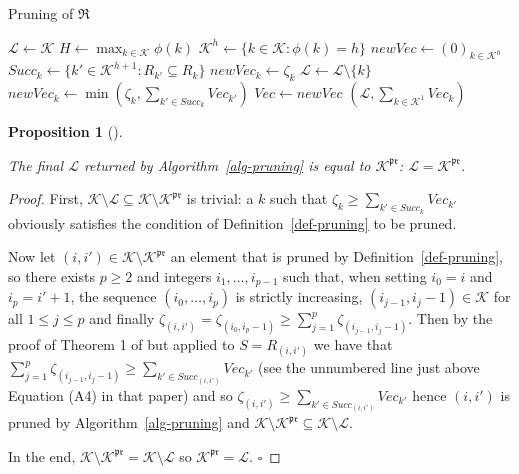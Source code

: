 \documentclass[
  11pt,
  a4paper,
]{article}
\theoremstyle{plain}
\newtheorem{proposition}{Proposition}[section]
\theoremstyle{plain}
\theoremstyle{plain}
\theoremstyle{definition}
\theoremstyle{definition}
\theoremstyle{remark}
\begin{document}
\begin{algorithm}[htb!]
\caption{Pruning of $\mathfrak{R}$}
\label{alg-pruning}
\begin{algorithmic}[1]
  \State $\mathcal{L}\gets\mathcal{K}$
  \State $ H \gets \max_{k\in\mathcal{K}} \phi(k)  $ 
    \State $\mathcal{K}^h\gets \{ k\in\mathcal{K} : \phi(k) =h  \}$
    \State $newVec\gets (0)_{k \in  \mathcal{K}^h}$
      \State $Succ_k \gets \{ k' \in  \mathcal{K}^{h+1} : R_{k'}\subseteq R_k\}$
        \State $newVec_k \gets \zeta_k$
      \Else
          \State $\mathcal{L}\gets \mathcal{L}\setminus \{ k \}$ 
        \EndIf
        \State $newVec_k \gets \min\left( \zeta_{k} ,  \sum_{k'\in Succ_k} Vec_{k'}   \right)$
      \EndIf
    \EndFor
    \State $Vec\gets newVec$
  \EndFor
  \State\Return $(\mathcal{L},\sum_{k\in\mathcal{K}^1} Vec_k  )$
\EndProcedure
\end{algorithmic}
\end{algorithm}

\begin{proposition}[]\protect\hypertarget{prp-pruning-correct}{}\label{prp-pruning-correct}

The final \(\mathcal{L}\) returned by  Algorithm~\ref{alg-pruning}  is
equal to \(\mathcal{K}^{\mathfrak{pr}}\):
\(\mathcal{L}=\mathcal{K}^{\mathfrak{pr}}\).

\end{proposition}

\begin{proof}
First,
\(\mathcal{K}\setminus\mathcal{L}\subseteq\mathcal{K}\setminus\mathcal{K}^{\mathfrak{pr}}\)
is trivial: a \(k\) such that
\(\zeta_{k} \geq  \sum_{k'\in Succ_k} Vec_{k'}\) obviously satisfies the
condition of Definition~\ref{def-pruning} to be pruned.

Now let \((i,i')\in \mathcal{K}\setminus\mathcal{K}^{\mathfrak{pr}}\) an
element that is pruned by Definition~\ref{def-pruning}, so there exists
\(p\geq2\) and integers \(i_1,\dotsc,i_{p-1}\) such that, when setting
\(i_0=i\) and \(i_{p}=i'+1\), the sequence \((i_0,\dotsc,i_{p})\) is
strictly increasing, \((i_{j-1},i_{j}-1)\in\mathcal{K}\) for all
\(1\leq j\leq p\) and finally
\(\zeta_{(i,i')}=\zeta_{(i_0,i_{p}-1)}\geq \sum_{j=1}^{p} \zeta_{(i_{j-1}, i_{j}-1)}\).
Then by the proof of Theorem 1 of \citet{MR4178188} but applied to
\(S=R_{(i,i')}\) we have that
\(\sum_{j=1}^{p} \zeta_{(i_{j-1}, i_{j}-1)}\geq  \sum_{k'\in Succ_{(i,i')}} Vec_{k'}\)
(see the unnumbered line just above Equation (A4) in that paper) and so
\(\zeta_{(i,i')}\geq \sum_{k'\in Succ_{(i,i')}} Vec_{k'}\) hence
\((i,i')\) is pruned by  Algorithm~\ref{alg-pruning}  and
\(\mathcal{K}\setminus\mathcal{K}^{\mathfrak{pr}}\subseteq\mathcal{K}\setminus\mathcal{L}\).

In the end,
\(\mathcal{K}\setminus\mathcal{K}^{\mathfrak{pr}}=\mathcal{K}\setminus\mathcal{L}\)
so \(\mathcal{K}^{\mathfrak{pr}}=\mathcal{L}\). \(\square\)
\end{proof}
\end{document}
